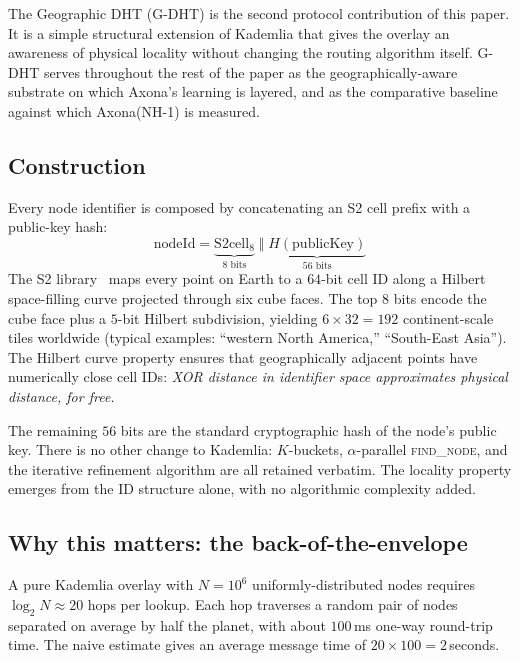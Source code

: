 \documentclass[conference]{IEEEtran}
\newcommand{\axona}{Axona\xspace}
\newcommand{\nhone}{NH-1\xspace}
\newcommand{\GDHT}{G-DHT\xspace}
\begin{document}
The Geographic DHT (\GDHT) is the second protocol contribution of this
paper. It is a simple structural extension of Kademlia that gives the
overlay an awareness of physical locality without changing the routing
algorithm itself. \GDHT serves throughout the rest of the paper as the
geographically-aware substrate on which \axona's learning is layered,
and as the comparative baseline against which \axona (\nhone) is measured.

\subsection{Construction}
\label{sec:gdht-construction}

Every node identifier is composed by concatenating an S2 cell prefix
with a public-key hash:
\begin{equation}
\mathrm{nodeId} = \underbrace{\mathrm{S2cell}_{8}}_{\text{8 bits}} \;\Vert\; \underbrace{H(\mathrm{publicKey})}_{\text{56 bits}}
\label{eq:gdht-id}
\end{equation}
The S2 library~\cite{s2geometry} maps every point on Earth to a $64$-bit
cell ID along a Hilbert space-filling curve projected through six cube
faces. The top $8$ bits encode the cube face plus a $5$-bit Hilbert
subdivision, yielding $6 \times 32 = 192$ continent-scale tiles
worldwide (typical examples: ``western North America,'' ``South-East
Asia''). The Hilbert curve property ensures that geographically
adjacent points have numerically close cell IDs: \emph{XOR distance
in identifier space approximates physical distance, for free.}

The remaining $56$ bits are the standard cryptographic hash of the
node's public key. There is no other change to Kademlia: $K$-buckets,
$\alpha$-parallel \textsc{find\_node}, and the iterative refinement
algorithm are all retained verbatim. The locality property emerges
from the ID structure alone, with no algorithmic complexity added.

\subsection{Why this matters: the back-of-the-envelope}
\label{sec:gdht-math}

A pure Kademlia overlay with $N = 10^6$ uniformly-distributed nodes
requires $\log_2 N \approx 20$ hops per lookup. Each hop traverses a
random pair of nodes separated on average by half the planet, with
about $100$\,ms one-way round-trip time. The naive estimate gives an
average message time of $20 \times 100 = 2$\,seconds.
\end{document}
